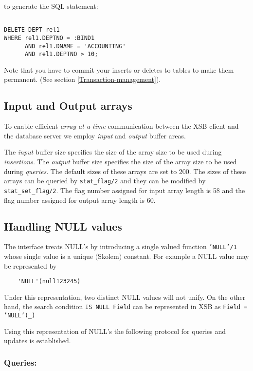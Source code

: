 to generate the SQL statement:
\begin{verbatim}

DELETE DEPT rel1 
WHERE rel1.DEPTNO = :BIND1 
      AND rel1.DNAME = 'ACCOUNTING'
      AND rel1.DEPTNO > 10;
\end{verbatim}


Note that you have to commit your inserts or deletes to tables to make
them permanent.  (See section \ref{Transaction-management}).

\subsection{Input and Output arrays}\label{Array-sizes}

To enable efficient {\it array at a time} communication between the XSB client
and the database server we employ {\it input} and  {\it output} buffer areas.

The {\it input} buffer size specifies the size of the array size to be used
during {\it insertions}. The {\it output} buffer size specifies the size of the
array size to be used during {\it queries}. The default sizes of these arrays
are set to 200. The sizes of these arrays can be queried by {\tt stat\_flag/2}
and they can be modified by {\tt stat\_set\_flag/2}. The flag number assigned
for input array length is 58 and  the flag number assigned for output array 
length is 60.

\subsection{Handling NULL values}\label{NULL-values}


The interface treats NULL's by introducing a single valued function
{\tt 'NULL'/1} whose single value is a unique $($Skolem$)$ constant.
For example a NULL value may be represented by 
\begin{verbatim}
	'NULL'(null123245) 
\end{verbatim} 
Under this representation, two distinct NULL values will not unify.
On the other hand, the search condition {\tt IS NULL Field} can be
represented in XSB as {\tt Field = 'NULL'(\_)}

Using this representation of NULL's the following protocol for queries
and updates is established.

\subsubsection{Queries:}

